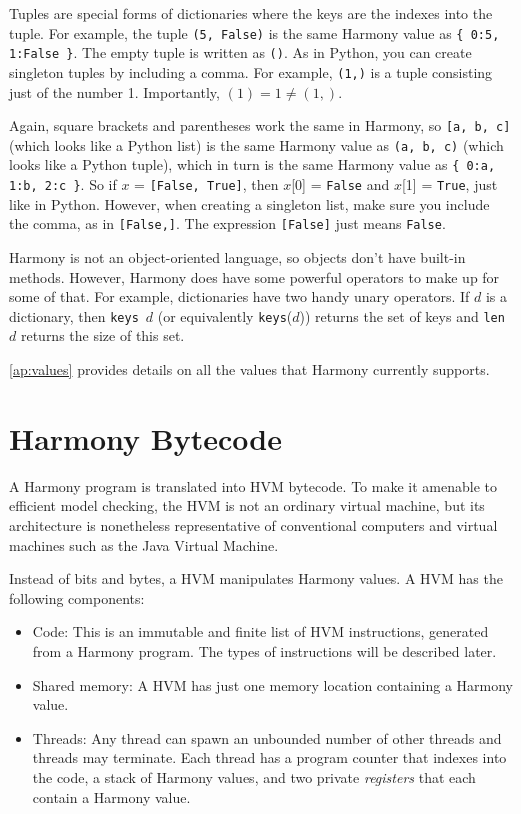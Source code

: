 \documentclass{report}
\begin{document}
Tuples are special forms of dictionaries where the keys are
the indexes into the tuple.  For example, the tuple
\texttt{(5, False)} is the same Harmony value as
\texttt{\{ 0:5, 1:False \}}.
The empty tuple is written as \texttt{()}.
As in Python, you can create singleton tuples by including a comma.
For example, \texttt{(1,)} is a tuple consisting just of the number 1.
Importantly, $(1) = 1 \ne (1,)$.

Again, square brackets and parentheses work the same in Harmony, so
\texttt{[a, b, c]} (which looks like a Python list)
is the same Harmony value as \texttt{(a, b, c)} (which looks like a Python tuple),
which in turn is the same Harmony value as \texttt{\{ 0:a, 1:b, 2:c \}}.
So if $x$ = \texttt{[False, True]},
then $x$[0] = \texttt{False} and $x$[1] = \texttt{True}, just like in Python.
However, when creating a singleton list, make sure you include the
comma, as in \texttt{[False,]}.  The expression \texttt{[False]} just means
\texttt{False}.

Harmony is not an object-oriented language, so objects don't have
built-in methods.  However, Harmony does have some powerful operators to
make up for some of that.
For example, dictionaries have two handy unary operators.
If $d$ is a
dictionary, then \texttt{keys}~$d$ (or equivalently \texttt{keys}($d$))
returns the set of keys and \texttt{len}~$d$ returns the size of
this set.

\autoref{ap:values} provides details on all the values that
Harmony currently supports.

\section*{Harmony Bytecode}

A Harmony program is translated into HVM bytecode.
To make it amenable to efficient model checking,
the HVM is not an ordinary virtual machine, but its architecture
is nonetheless representative of conventional computers and
virtual machines such as the Java Virtual Machine.

Instead of bits and bytes, a HVM manipulates Harmony values.
A HVM has the following components:
\begin{itemize}
\item Code:  This is an immutable and finite list of HVM instructions,
generated from a Harmony program.  The types of instructions will be described later.
\item Shared memory: A HVM has just one memory location containing
a Harmony value.
\item Threads:  Any thread
can spawn an unbounded number of other threads and threads may terminate.
Each thread has a program counter that indexes into the code,
%
a stack of Harmony values,
and two private \emph{registers} that each contain a Harmony value.
%
\end{itemize}
\end{document}
